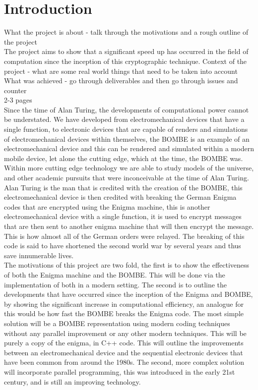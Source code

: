 \documentclass[12pt,a4paper]{article}
\begin{document}
\section{Introduction}

What the project is about - talk through the motivations and a rough outline of the project\\
The project aims to show that a significant speed up has occurred in the field of computation since the inception of this cryptographic technique.
Context of the project - what are some real world things that need to be taken into account\\
What was achieved - go through deliverables and then go through issues and counter\\
2-3 pages\\

Since the time of Alan Turing, the developments of computational power cannot be understated. We have developed from electromechanical devices that have a single function, to electronic devices that are capable of renders and simulations of electromechanical devices within themselves, the BOMBE is an example of an electromechanical device and this can be rendered and simulated within a modern mobile device, let alone the cutting edge, which at the time, the BOMBE was. Within more cutting edge technology we are able to study models of the universe, and other academic pursuits that were inconceivable at the time of Alan Turing.\\

Alan Turing is the man that is credited with the creation of the BOMBE, this electromechanical device is then credited with breaking the German Enigma codes that are encrypted using the Enigma machine, this is another electromechanical device with a single function, it is used to encrypt messages that are then sent to another enigma machine that will then encrypt the message. This is how almost all of the German orders were relayed. The breaking of this code is said to have shortened the second world war by several years and thus save innumerable lives.\\

The motivations of this project are two fold, the first is to show the effectiveness of both the Enigma machine and the BOMBE. This will be done via the implementation of both in a modern setting. The second is to outline the developments that have occurred since the inception of the Enigma and BOMBE, by showing the significant increase in computational efficiency, an analogue for this would be how fast the BOMBE breaks the Enigma code. The most simple solution will be a BOMBE representation using modern coding techniques without any parallel improvement or any other modern techniques. This will be purely a copy of the enigma, in C++ code. This will outline the improvements between an electromechanical device and the sequential electronic devices that have been common from around the 1980s. The second, more complex solution will incorporate parallel programming, this was introduced in the early 21st century, and is still an improving technology.\\
\end{document}
